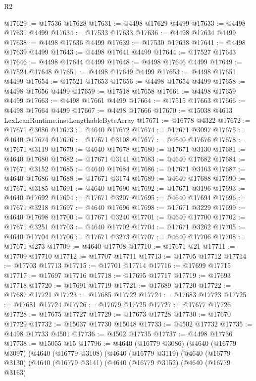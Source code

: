 \begin{lexlean}{R2}
\begin{coremodule}
@17629 := @17536 @17628
@17631 := @4498 @17629 @4499
@17633 := @4498 @17631 @4499
@17634 := @17533 @17633
@17636 := @4498 @17634 @4499
@17638 := @4498 @17636 @4499
@17639 := @17530 @17638
@17641 := @4498 @17639 @4499
@17643 := @4498 @17641 @4499
@17644 := @17527 @17643
@17646 := @4498 @17644 @4499
@17648 := @4498 @17646 @4499
@17649 := @17524 @17648
@17651 := @4498 @17649 @4499
@17653 := @4498 @17651 @4499
@17654 := @17521 @17653
@17656 := @4498 @17654 @4499
@17658 := @4498 @17656 @4499
@17659 := @17518 @17658
@17661 := @4498 @17659 @4499
@17663 := @4498 @17661 @4499
@17664 := @17515 @17663
@17666 := @4498 @17664 @4499
@17667 := @4498 @17666
@17670 := @15038 @4613 LexLeanRuntime.instLengthableByteArray
@17671 := @16778 @4322
@17672 := @17671 @3086
@17673 := @4640 @17672
@17674 := @17671 @3097
@17675 := @4640 @17674
@17676 := @17671 @3108
@17677 := @4640 @17676
@17678 := @17671 @3119
@17679 := @4640 @17678
@17680 := @17671 @3130
@17681 := @4640 @17680
@17682 := @17671 @3141
@17683 := @4640 @17682
@17684 := @17671 @3152
@17685 := @4640 @17684
@17686 := @17671 @3163
@17687 := @4640 @17686
@17688 := @17671 @3174
@17689 := @4640 @17688
@17690 := @17671 @3185
@17691 := @4640 @17690
@17692 := @17671 @3196
@17693 := @4640 @17692
@17694 := @17671 @3207
@17695 := @4640 @17694
@17696 := @17671 @3218
@17697 := @4640 @17696
@17698 := @17671 @3229
@17699 := @4640 @17698
@17700 := @17671 @3240
@17701 := @4640 @17700
@17702 := @17671 @3251
@17703 := @4640 @17702
@17704 := @17671 @3262
@17705 := @4640 @17704
@17706 := @17671 @3273
@17707 := @4640 @17706
@17708 := @17671 @273
@17709 := @4640 @17708
@17710 := @17671 @21
@17711 := @17709 @17710
@17712 := @17707 @17711
@17713 := @17705 @17712
@17714 := @17703 @17713
@17715 := @17701 @17714
@17716 := @17699 @17715
@17717 := @17697 @17716
@17718 := @17695 @17717
@17719 := @17693 @17718
@17720 := @17691 @17719
@17721 := @17689 @17720
@17722 := @17687 @17721
@17723 := @17685 @17722
@17724 := @17683 @17723
@17725 := @17681 @17724
@17726 := @17679 @17725
@17727 := @17677 @17726
@17728 := @17675 @17727
@17729 := @17673 @17728
@17730 := @17670 @17729
@17732 := @15037 @17730 @15048
@17733 := @4502 @17732
@17735 := @4498 @17733 @4501
@17736 := @4502 @17735
@17737 := @4498 @17736
@17738 := @15055 @15
@17796 := @4640
    (@16779 @3086)
    (@4640
      (@16779 @3097)
      (@4640
        (@16779 @3108)
        (@4640
          (@16779 @3119)
          (@4640
            (@16779 @3130)
            (@4640
              (@16779 @3141)
              (@4640
                (@16779 @3152)
                (@4640
                  (@16779 @3163)

\end{coremodule}
\end{lexlean}
